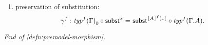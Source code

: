 \begin{defn}
\begin{enumerate}
\begin{comment}
\mftyp{f}{\ctxext{\Gamma}{A}}_0(\ctxwk{A}{B})\jdeq\ctxwk{\mftyp{f}{\Gamma}_0(A)}{\mftyp{f}{\Gamma}_0(B)}
\end{equation*}
for every two types $A$ and $B$ in context $\Gamma$.
\item the judgmental equality
\begin{equation*}
\mftyp{f}{\ctxext{{\Gamma}{A}}{\ctxwk{A}{B}}}\circ\tfwk^A\jdeq\tfwk^{\protect{\mftyp{f}{\Gamma}_0(A)}}\circ\mftyp{f}{\ctxext{\Gamma}{B}}
\end{equation*}
\item the judgmental equality
\begin{equation*}
\terms[f]{\ctxwk{A}{B}}{{A}{y}}\jdeq\ctxwk{\mftyp{f}\Gamma_0(A)}{(\terms[f]{B}(y))}
\end{equation*}
\end{enumerate}
\end{comment}
\item preservation of substitution: 
\begin{equation*}
\gamma^f:\id{\mftyp{f}\Gamma_0\circ\tfsubst^x}{\tfsubst^\protect{\terms[f]{A}(x)}\circ\mftyp{f}{\ctxext{\Gamma}{A}}}.
\end{equation*}
\begin{comment}
\begin{enumerate}
\item the judgmental equality
\begin{equation*}
\mftyp{f}\Gamma_0(\subst{x}{P})\jdeq\subst{\terms[f]{A}(x)}{\mftyp{f}{\ctxext{\Gamma}{A}}_0(P)}
\end{equation*}
for every family $P$ over $A$ in context $\Gamma$ and every term $x:A$.
\item the judgmental equality
\begin{equation*}
\mftyp{f}\Gamma_0(\subst{x}{Q})\jdeq\subst{\terms[f]{A}(x)}{\mftyp{f}{\ctxext{{\Gamma}{A}}{P}}_0(Q)}
\end{equation*}
for every family $Q$ over $P$ over $A$ in context $\Gamma$ and every term $x:A$.
\end{enumerate}
\end{comment}
\end{enumerate}
\begin{flushright}
\textsl{End of \autoref{defn:premodel-morphism}.}
\end{flushright}
\end{defn}

